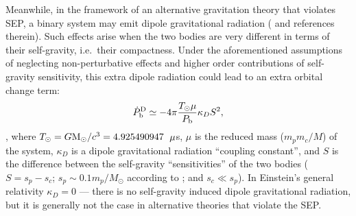 Meanwhile, in the framework of an alternative gravitation theory that violates
SEP, a binary system may emit dipole gravitational radiation (\citealt{Will93, Will01, lwj+09, fwe+12} and references
therein). Such effects arise when the two bodies are very different in terms
of their self-gravity, i.e.~their compactness.
Under the aforementioned assumptions of neglecting non-perturbative effects and higher order contributions of self-gravity sensitivity,
this extra dipole radiation could lead to an extra orbital change term:
\begin{equation}
\dot{P}_{\rm b}^{\rm D} \simeq -4\pi\frac{T_{\odot}\mu}{P_{\rm b}}\kappa_D S^2,
\end{equation}
\citep{Will93,lwj+09}, where $T_{\odot}=G{\rm M_{\odot}}/c^3=4.925490947$~${\rm
\mu}$s, $\mu$ is the reduced mass ($m_pm_c/M$) of the system,
$\kappa_D$ is a dipole
gravitational radiation ``coupling constant'', and $S$ is the difference
between the self-gravity ``sensitivities'' of the two bodies ($S = s_p - s_c$;
$s_p\sim0.1m_p/M_{\odot}$ according to \citealt{de92} ; and $s_c\ll s_p$).
In Einstein's general relativity $\kappa_D=0$ --- there is no self-gravity induced
dipole gravitational radiation, but it is generally not the case in alternative
theories that violate the SEP.

